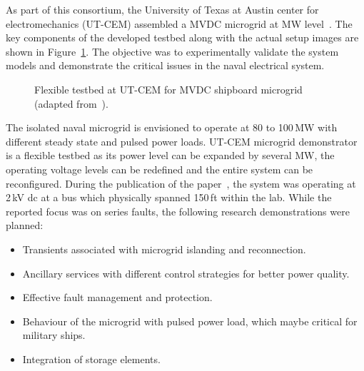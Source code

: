 \documentclass[10pt]{IETBook}
\begin{document}
As part of this consortium, the University of Texas at Austin center for electromechanics (UT-CEM) assembled a MVDC microgrid at MW level~\cite{austin}. The key components of the developed testbed along with the actual setup images are shown in Figure~\ref{figaustin}. The objective was to experimentally validate the system models and demonstrate the critical issues in the naval electrical system.
\begin{figure}[!h]
\centerline{}
\caption{Flexible testbed at UT-CEM for MVDC shipboard microgrid (adapted from~\cite{austin}).}
\label{figaustin}
\end{figure}

The isolated naval microgrid is envisioned to operate at 80 to 100\,MW with different steady state and pulsed power loads. UT-CEM microgrid demonstrator is a flexible testbed as its power level can be expanded by several MW, the operating voltage levels can be redefined and the entire system can be reconfigured. During the publication of the paper~\cite{austin}, the system was operating at 2\,kV dc at a bus which physically spanned 150\,ft within the lab. While the reported focus was on series faults, the following research demonstrations were planned:
\begin{itemize}
    \item Transients associated with microgrid islanding and reconnection.
    \item Ancillary services with different control strategies for better power quality.
    \item Effective fault management and protection. 
    \item Behaviour of the microgrid with pulsed power load, which maybe critical for military ships.
    \item Integration of storage elements.
\end{itemize}
\end{document}
